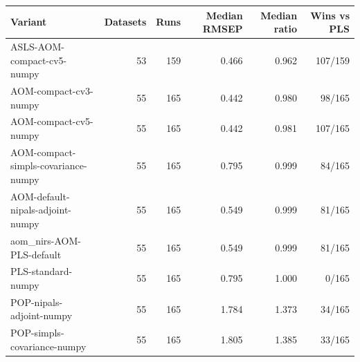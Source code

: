 \begin{tabularx}{\linewidth}{Xrrrrr}
\toprule
Variant & Datasets & Runs & Median RMSEP & Median ratio & Wins vs PLS \\
\midrule
ASLS-AOM-compact-cv5-numpy & 53 & 159 & 0.466 & 0.962 & 107/159 \\
AOM-compact-cv3-numpy & 55 & 165 & 0.442 & 0.980 & 98/165 \\
AOM-compact-cv5-numpy & 55 & 165 & 0.442 & 0.981 & 107/165 \\
AOM-compact-simpls-covariance-numpy & 55 & 165 & 0.795 & 0.999 & 84/165 \\
AOM-default-nipals-adjoint-numpy & 55 & 165 & 0.549 & 0.999 & 81/165 \\
aom\_nirs-AOM-PLS-default & 55 & 165 & 0.549 & 0.999 & 81/165 \\
PLS-standard-numpy & 55 & 165 & 0.795 & 1.000 & 0/165 \\
POP-nipals-adjoint-numpy & 55 & 165 & 1.784 & 1.373 & 34/165 \\
POP-simpls-covariance-numpy & 55 & 165 & 1.805 & 1.385 & 33/165 \\
\bottomrule
\end{tabularx}
